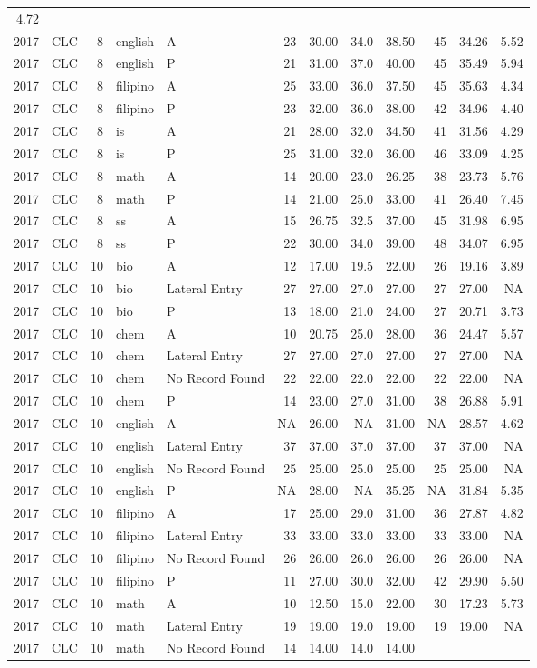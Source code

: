 \documentclass[]{article}
\begin{document}
\begin{longtable}[]{@{}rlrllrrrrrrr@{}}
4.72\tabularnewline
2017 & CLC & 8 & english & A & 23 & 30.00 & 34.0 & 38.50 & 45 & 34.26 &
5.52\tabularnewline
2017 & CLC & 8 & english & P & 21 & 31.00 & 37.0 & 40.00 & 45 & 35.49 &
5.94\tabularnewline
2017 & CLC & 8 & filipino & A & 25 & 33.00 & 36.0 & 37.50 & 45 & 35.63 &
4.34\tabularnewline
2017 & CLC & 8 & filipino & P & 23 & 32.00 & 36.0 & 38.00 & 42 & 34.96 &
4.40\tabularnewline
2017 & CLC & 8 & is & A & 21 & 28.00 & 32.0 & 34.50 & 41 & 31.56 &
4.29\tabularnewline
2017 & CLC & 8 & is & P & 25 & 31.00 & 32.0 & 36.00 & 46 & 33.09 &
4.25\tabularnewline
2017 & CLC & 8 & math & A & 14 & 20.00 & 23.0 & 26.25 & 38 & 23.73 &
5.76\tabularnewline
2017 & CLC & 8 & math & P & 14 & 21.00 & 25.0 & 33.00 & 41 & 26.40 &
7.45\tabularnewline
2017 & CLC & 8 & ss & A & 15 & 26.75 & 32.5 & 37.00 & 45 & 31.98 &
6.95\tabularnewline
2017 & CLC & 8 & ss & P & 22 & 30.00 & 34.0 & 39.00 & 48 & 34.07 &
6.95\tabularnewline
2017 & CLC & 10 & bio & A & 12 & 17.00 & 19.5 & 22.00 & 26 & 19.16 &
3.89\tabularnewline
2017 & CLC & 10 & bio & Lateral Entry & 27 & 27.00 & 27.0 & 27.00 & 27 &
27.00 & NA\tabularnewline
2017 & CLC & 10 & bio & P & 13 & 18.00 & 21.0 & 24.00 & 27 & 20.71 &
3.73\tabularnewline
2017 & CLC & 10 & chem & A & 10 & 20.75 & 25.0 & 28.00 & 36 & 24.47 &
5.57\tabularnewline
2017 & CLC & 10 & chem & Lateral Entry & 27 & 27.00 & 27.0 & 27.00 & 27
& 27.00 & NA\tabularnewline
2017 & CLC & 10 & chem & No Record Found & 22 & 22.00 & 22.0 & 22.00 &
22 & 22.00 & NA\tabularnewline
2017 & CLC & 10 & chem & P & 14 & 23.00 & 27.0 & 31.00 & 38 & 26.88 &
5.91\tabularnewline
2017 & CLC & 10 & english & A & NA & 26.00 & NA & 31.00 & NA & 28.57 &
4.62\tabularnewline
2017 & CLC & 10 & english & Lateral Entry & 37 & 37.00 & 37.0 & 37.00 &
37 & 37.00 & NA\tabularnewline
2017 & CLC & 10 & english & No Record Found & 25 & 25.00 & 25.0 & 25.00
& 25 & 25.00 & NA\tabularnewline
2017 & CLC & 10 & english & P & NA & 28.00 & NA & 35.25 & NA & 31.84 &
5.35\tabularnewline
2017 & CLC & 10 & filipino & A & 17 & 25.00 & 29.0 & 31.00 & 36 & 27.87
& 4.82\tabularnewline
2017 & CLC & 10 & filipino & Lateral Entry & 33 & 33.00 & 33.0 & 33.00 &
33 & 33.00 & NA\tabularnewline
2017 & CLC & 10 & filipino & No Record Found & 26 & 26.00 & 26.0 & 26.00
& 26 & 26.00 & NA\tabularnewline
2017 & CLC & 10 & filipino & P & 11 & 27.00 & 30.0 & 32.00 & 42 & 29.90
& 5.50\tabularnewline
2017 & CLC & 10 & math & A & 10 & 12.50 & 15.0 & 22.00 & 30 & 17.23 &
5.73\tabularnewline
2017 & CLC & 10 & math & Lateral Entry & 19 & 19.00 & 19.0 & 19.00 & 19
& 19.00 & NA\tabularnewline
2017 & CLC & 10 & math & No Record Found & 14 & 14.00 & 14.0 & 14.00 &

\end{longtable}
\end{document}

